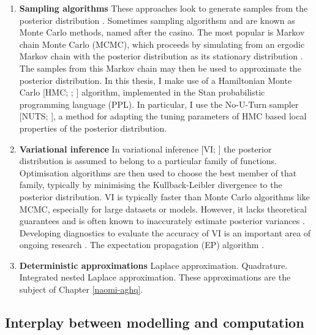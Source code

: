 \documentclass[a4paper, nobind]{templates/ociamthesis}
\providecommand{\tightlist}{%
  \setlength{\itemsep}{0pt}\setlength{\parskip}{0pt}}
\begin{document}
\begin{enumerate}
\def\labelenumi{\arabic{enumi}.}
\tightlist
\item
  \textbf{Sampling algorithms} These approaches look to generate samples from the posterior distribution \autocite{robert2005monte}.
  Sometimes sampling algorithsm and are known as Monte Carlo methods, named after the casino.
  The most popular is Markov chain Monte Carlo (MCMC), which proceeds by simulating from an ergodic Markov chain with the posterior distribution as its stationary distribution \autocite{roberts2004general}.
  The samples from this Markov chain may then be used to approximate the posterior distribution.
  In this thesis, I make use of a Hamiltonian Monte Carlo {[}HMC; \textcite{duane1987hybrid}; \textcite{neal2011mcmc}{]} algorithm, implemented in the Stan \autocite{carpenter2017stan} probabilistic programming language (PPL).
  In particular, I use the No-U-Turn sampler {[}NUTS; \textcite{hoffman2014no}{]}, a method for adapting the tuning parameters of HMC based local properties of the posterior distribution.
\item
  \textbf{Variational inference} In variational inference {[}VI; \textcite{blei2017variational}{]} the posterior distribution is assumed to belong to a particular family of functions.
  Optimisation algorithms are then used to choose the best member of that family, typically by minimising the Kullback-Leibler divergence to the posterior distribution.
  VI is typically faster than Monte Carlo algorithms like MCMC, especially for large datasets or models.
  However, it lacks theoretical guarantees and is often known to inaccurately estimate posterior variances \autocite{giordano2018covariances}.
  Developing diagnostics to evaluate the accuracy of VI is an important area of ongoing research \autocite{yao2018yes}.
  The expectation propagation (EP) algorithm \autocite{minka2001expectation}.
\item
  \textbf{Deterministic approximations}
  Laplace approximation.
  Quadrature.
  Integrated nested Laplace approximation.
  These approximations are the subject of Chapter \ref{naomi-aghq}.
\end{enumerate}

\hypertarget{interplay-between-modelling-and-computation}{%
\subsection{Interplay between modelling and computation}\label{interplay-between-modelling-and-computation}}
\end{document}
